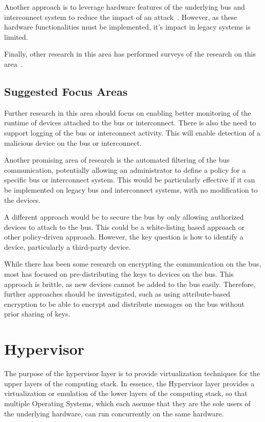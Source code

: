 \documentclass[11pt,letterpaper]{article}
\begin{document}
Another approach is to leverage hardware features of the underlying
bus and interconnect system to reduce the impact of an
attack~\cite{Wolf2012, Wojtczuk2011}. However, as these hardware
functionalities must be implemented, it's impact in legacy systems is
limited.

Finally, other research in this area has performed surveys of the
research on this area~\cite{Kleberger2011, Studnia2013, Thom2008,
  Wolf2004, Wolf2007, Wright2011, Zhao2002}.

\subsection{Suggested Focus Areas}

Further research in this area should focus on enabling better
monitoring of the runtime of devices attached to the bus or
interconnect. There is also the need to support logging of the bus or
interconnect activity. This will enable detection of a malicious
device on the bus or interconnect.

Another promising area of research is the automated filtering of
the bus communication, potentially allowing an administrator to define
a policy for a specific bus or interconnect system. This would be
particularly effective if it can be implemented on legacy bus and
interconnect systems, with no modification to the devices.

A different approach would be to secure the bus by only allowing
authorized devices to attach to the bus. This could be a white-listing
based approach or other policy-driven approach. However, the key
question is how to identify a device, particularly a third-party
device.

While there has been some research on encrypting the communication on
the bus, most has focused on pre-distributing the keys to devices on
the bus. This approach is brittle, as new devices cannot be added to
the bus easily. Therefore, further approaches should be investigated,
such as using attribute-based encryption to be able to encrypt and
distribute messages on the bus without prior sharing of keys.

\section{Hypervisor}

The purpose of the hypervisor layer is to provide virtualization
techniques for the upper layers of the computing stack. In essence,
the Hypervisor layer provides a virtualization or emulation of the
lower layers of the computing stack, so that multiple Operating
Systems, which each assume that they are the sole users of the
underlying hardware, can run concurrently on the same hardware.
\end{document}
